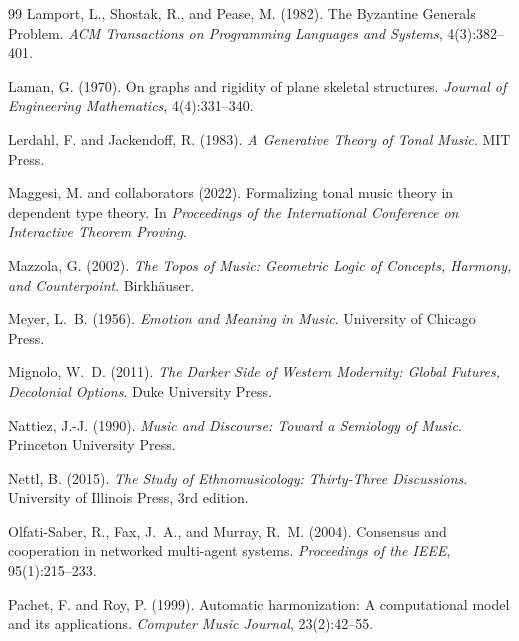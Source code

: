 \documentclass[cmj]{article}
\begin{document}
\begin{thebibliography}{99}
Lamport, L., Shostak, R., and Pease, M. (1982).
\newblock The Byzantine Generals Problem.
\newblock \emph{ACM Transactions on Programming Languages and Systems}, 4(3):382--401.

Laman, G. (1970).
\newblock On graphs and rigidity of plane skeletal structures.
\newblock \emph{Journal of Engineering Mathematics}, 4(4):331--340.

Lerdahl, F. and Jackendoff, R. (1983).
\newblock \emph{A Generative Theory of Tonal Music}.
\newblock MIT Press.

Maggesi, M. and collaborators (2022).
\newblock Formalizing tonal music theory in dependent type theory.
\newblock In \emph{Proceedings of the International Conference on Interactive Theorem Proving}.

Mazzola, G. (2002).
\newblock \emph{The Topos of Music: Geometric Logic of Concepts, Harmony, and Counterpoint}.
\newblock Birkh\"{a}user.

Meyer, L.~B. (1956).
\newblock \emph{Emotion and Meaning in Music}.
\newblock University of Chicago Press.

Mignolo, W.~D. (2011).
\newblock \emph{The Darker Side of Western Modernity: Global Futures, Decolonial Options}.
\newblock Duke University Press.

Nattiez, J.-J. (1990).
\newblock \emph{Music and Discourse: Toward a Semiology of Music}.
\newblock Princeton University Press.

Nettl, B. (2015).
\newblock \emph{The Study of Ethnomusicology: Thirty-Three Discussions}.
\newblock University of Illinois Press, 3rd edition.

Olfati-Saber, R., Fax, J.~A., and Murray, R.~M. (2004).
\newblock Consensus and cooperation in networked multi-agent systems.
\newblock \emph{Proceedings of the IEEE}, 95(1):215--233.

Pachet, F. and Roy, P. (1999).
\newblock Automatic harmonization: A computational model and its applications.
\newblock \emph{Computer Music Journal}, 23(2):42--55.


\end{thebibliography}
\end{document}
